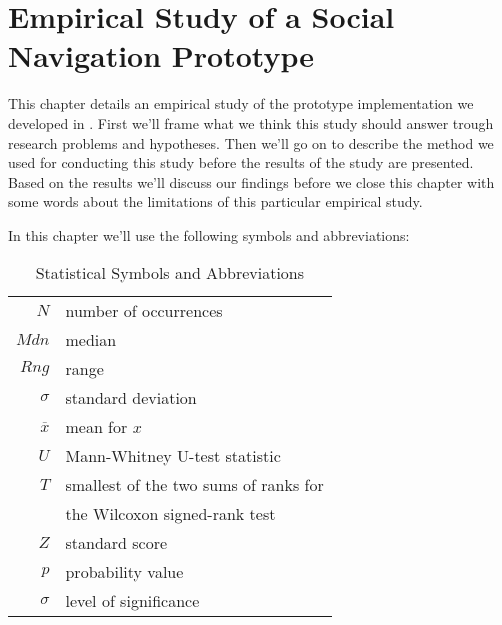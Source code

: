 \chapter{Empirical Study of a Social Navigation Prototype}
\label{chapter:empirical}

This chapter details an empirical study of the prototype implementation we
developed in . First we'll frame what we think this
study should answer trough research problems and hypotheses. Then we'll go on
to describe the method we used for conducting this study before the results of
the study are presented. Based on the results we'll discuss our findings
before we close this chapter with some words about the limitations of this
particular empirical study.

In this chapter we'll use the following symbols and abbreviations:

\begin{table}[!h]
  \begin{tabular}{rl}

  $N$ & number of occurrences \\
  $Mdn$ & median \\
  $Rng$ & range \\
  $\sigma$ & standard deviation \\
  $\overline{x}$ & mean for $x$ \\
  $U$ & Mann-Whitney U-test statistic \\
  $T$ & smallest of the two sums of ranks for \\
      & the Wilcoxon signed-rank test \\
  $Z$ & standard score \\
  $p$ & probability value \\
  $\sigma$ & level of significance \\

  \end{tabular}

  \caption[Statistical Symbols]{Statistical Symbols and Abbreviations}
  \label{table:literature.databases}
\end{table}






